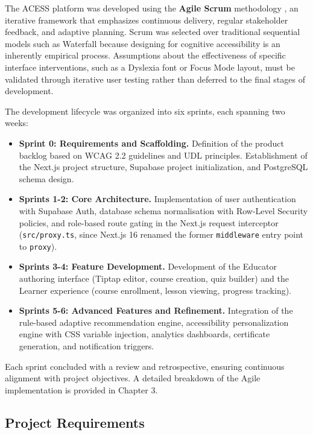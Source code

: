 \documentclass[12pt, oneside]{article} %
\begin{document}
The ACESS platform was developed using the \textbf{Agile Scrum} methodology \cite{schwaber1995scrum}, an iterative framework that emphasizes continuous delivery, regular stakeholder feedback, and adaptive planning. Scrum was selected over traditional sequential models such as Waterfall because designing for cognitive accessibility is an inherently empirical process. Assumptions about the effectiveness of specific interface interventions, such as a Dyslexia font or Focus Mode layout, must be validated through iterative user testing rather than deferred to the final stages of development.

The development lifecycle was organized into six sprints, each spanning two weeks:

\begin{itemize}
    \item \textbf{Sprint 0: Requirements and Scaffolding.} Definition of the product backlog based on WCAG 2.2 guidelines and UDL principles. Establishment of the Next.js project structure, Supabase project initialization, and PostgreSQL schema design.
    \item \textbf{Sprints 1-2: Core Architecture.} Implementation of user authentication with Supabase Auth, database schema normalisation with Row-Level Security policies, and role-based route gating in the Next.js request interceptor (\texttt{src/proxy.ts}, since Next.js 16 renamed the former \texttt{middleware} entry point to \texttt{proxy}).
    \item \textbf{Sprints 3-4: Feature Development.} Development of the Educator authoring interface (Tiptap editor, course creation, quiz builder) and the Learner experience (course enrollment, lesson viewing, progress tracking).
    \item \textbf{Sprints 5-6: Advanced Features and Refinement.} Integration of the rule-based adaptive recommendation engine, accessibility personalization engine with CSS variable injection, analytics dashboards, certificate generation, and notification triggers.
\end{itemize}

Each sprint concluded with a review and retrospective, ensuring continuous alignment with project objectives. A detailed breakdown of the Agile implementation is provided in Chapter 3.

\subsection{Project Requirements}
\end{document}
